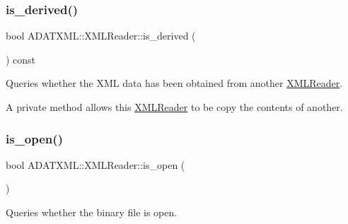 \subsubsection{\texorpdfstring{is\_derived()}{is\_derived()}\hspace{0.1cm}{\footnotesize\ttfamily [2/2]}}
{\footnotesize\ttfamily bool A\+D\+A\+T\+X\+M\+L\+::\+X\+M\+L\+Reader\+::is\+\_\+derived (\begin{DoxyParamCaption}{ }\end{DoxyParamCaption}) const}



Queries whether the X\+ML data has been obtained from another \mbox{\hyperlink{classADATXML_1_1XMLReader}{X\+M\+L\+Reader}}. 

A private method allows this \mbox{\hyperlink{classADATXML_1_1XMLReader}{X\+M\+L\+Reader}} to be copy the contents of another. \mbox{\label{classADATXML_1_1XMLReader_ae9e467fca3d4bf34351dc00e9797a06f}} 
\subsubsection{\texorpdfstring{is\_open()}{is\_open()}\hspace{0.1cm}{\footnotesize\ttfamily [1/2]}}
{\footnotesize\ttfamily bool A\+D\+A\+T\+X\+M\+L\+::\+X\+M\+L\+Reader\+::is\+\_\+open (\begin{DoxyParamCaption}{ }\end{DoxyParamCaption})\hspace{0.3cm}{\ttfamily [inline]}}



Queries whether the binary file is open. 

